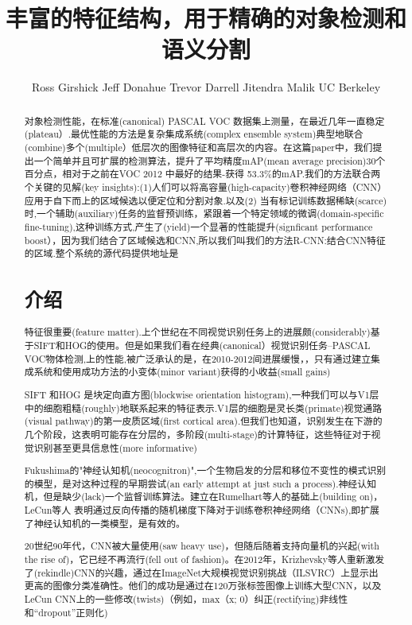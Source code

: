 \documentclass[a4paper,UTF8]{ctexart}
\theoremstyle{definition}
\begin{document}
\title{丰富的特征结构，用于精确的对象检测和语义分割}
\author{Ross Girshick Jeff Donahue Trevor Darrell Jitendra Malik UC Berkeley}
\maketitle
\begin{abstract}
对象检测性能，在标准(canonical) PASCAL VOC 数据集上测量，在最近几年一直稳定(plateau）.最优性能的方法是复杂集成系统(complex ensemble system)典型地联合(combine)多个(multiple）低层次的图像特征和高层次的内容。在这篇paper中，我们提出一个简单并且可扩展的检测算法，提升了平均精度mAP(mean average precision)30个百分点，相对于之前在VOC 2012 中最好的结果-获得 53.3\%的mAP.我们的方法联合两个关键的见解(key insights):(1)人们可以将高容量(high-capacity)卷积神经网络（CNN）应用于自下而上的区域候选以便定位和分割对象.以及(2) 当有标记训练数据稀缺(scarce)时,一个辅助(auxiliary)任务的监督预训练，紧跟着一个特定领域的微调(domain-specific fine-tuning),这种训练方式,产生了(yield)一个显著的性能提升(signficant performance boost），因为我们结合了区域候选和CNN,所以我们叫我们的方法R-CNN:结合CNN特征的区域.整个系统的源代码提供地址是

\section{介绍}
特征很重要(feature matter).上个世纪在不同视觉识别任务上的进展颇(considerably)基于SIFT和HOG的使用。但是如果我们看在经典(canonical）视觉识别任务--PASCAL VOC物体检测,上的性能,被广泛承认的是，在2010-2012间进展缓慢，，只有通过建立集成系统和使用成功方法的小变体(minor variant)获得的小收益(small gains)

SIFT 和HOG 是块定向直方图(blockwise orientation histogram),一种我们可以与V1层中的细胞粗糙(roughly)地联系起来的特征表示.V1层的细胞是灵长类(primate)视觉通路(visual pathway)的第一皮质区域(first cortical area).但我们也知道，识别发生在下游的几个阶段，这表明可能存在分层的，多阶段(multi-stage)的计算特征，这些特征对于视觉识别甚至更具信息性(more informative)

Fukushima的"神经认知机(neocognitron)",一个生物启发的分层和移位不变性的模式识别的模型，是对这种过程的早期尝试(an early attempt at just such a process).神经认知机，但是缺少(lack)一个监督训练算法。建立在Rumelhart等人的基础上(building on)，LeCun等人 表明通过反向传播的随机梯度下降对于训练卷积神经网络（CNNs),即扩展了神经认知机的一类模型，是有效的。

20世纪90年代，CNN被大量使用(saw heavy use)，但随后随着支持向量机的兴起(with the rise of)，它已经不再流行(fell out of fashion)。在2012年，Krizhevsky等人重新激发了(rekindle)CNN的兴趣，通过在ImageNet大规模视觉识别挑战（ILSVRC）上显示出更高的图像分类准确性。他们的成功是通过在120万张标签图像上训练大型CNN，以及LeCun CNN上的一些修改(twists)（例如，max（x; 0）纠正(rectifying)非线性和“dropout”正则化)


\end{abstract}
\end{document}
